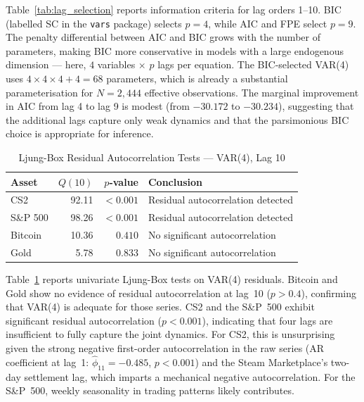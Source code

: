 Table~\ref{tab:lag_selection} reports information criteria for lag orders 1--10.
BIC (labelled SC in the \texttt{vars} package) selects $p = 4$, while AIC and
FPE select $p = 9$. The penalty differential between AIC and BIC grows with the
number of parameters, making BIC more conservative in models with a large
endogenous dimension --- here, $4$ variables $\times$ $p$ lags per equation.
The BIC-selected VAR(4) uses $4 \times 4 \times 4 + 4 = 68$ parameters, which
is already a substantial parameterisation for $N = 2{,}444$ effective
observations. The marginal improvement in AIC from lag 4 to lag 9 is modest
(from $-30.172$ to $-30.234$), suggesting that the additional lags capture only
weak dynamics and that the parsimonious BIC choice is appropriate for
inference.

\begin{table}[H]
\centering
\caption{Ljung-Box Residual Autocorrelation Tests --- VAR(4), Lag 10}
\label{tab:ljungbox}
\begin{tabular}{lrrl}
\hline
Asset    & $Q(10)$ & $p$-value & Conclusion \\
\hline
CS2      & 92.11   & $<0.001$  & Residual autocorrelation detected \\
S\&P 500 & 98.26   & $<0.001$  & Residual autocorrelation detected \\
Bitcoin  & 10.36   & $0.410$   & No significant autocorrelation \\
Gold     &  5.78   & $0.833$   & No significant autocorrelation \\
\hline
\end{tabular}
\end{table}

Table~\ref{tab:ljungbox} reports univariate Ljung-Box tests on VAR(4) residuals.
Bitcoin and Gold show no evidence of residual autocorrelation at lag~10
($p > 0.4$), confirming that VAR(4) is adequate for those series. CS2 and the
S\&P~500 exhibit significant residual autocorrelation ($p < 0.001$), indicating
that four lags are insufficient to fully capture the joint dynamics. For CS2,
this is unsurprising given the strong negative first-order autocorrelation in
the raw series (AR coefficient at lag~1: $\hat{\phi}_{11} = -0.485$, $p <
0.001$) and the Steam Marketplace's two-day settlement lag, which imparts a
mechanical negative autocorrelation. For the S\&P~500, weekly seasonality in
trading patterns likely contributes.

